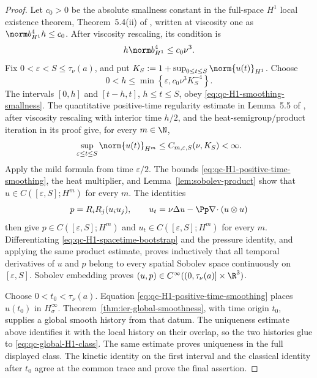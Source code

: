 \begin{proof}
Let \(c_0>0\) be the absolute smallness constant in the full-space
\(H^1\) local existence theorem, Theorem~5.4(ii) of \cite{Tao2013},
written at viscosity one as
\(\norm b_{H^1}^4h\le c_0\).  After viscosity rescaling, its condition is
\begin{equation}
 h\norm b_{H^1}^4\le c_0\nu^3.
 \label{eq:qc-H1-smoothing-smallness}
\end{equation}
Fix \(0<\varepsilon<S\le\tau_\nu(a)\), and put
\(K_S:=1+\sup_{0\le t\le S}\norm{u(t)}_{H^1}\).  Choose
\[
 0<h\le\min\left\{\varepsilon,
 c_0\nu^3K_S^{-4}\right\}.
\]
The intervals \([0,h]\) and \([t-h,t]\), \(h\le t\le S\), obey
\eqref{eq:qc-H1-smoothing-smallness}.  The quantitative positive-time
regularity estimate in Lemma~5.5 of \cite{Tao2013}, after viscosity
rescaling with interior time \(h/2\), and the
heat-semigroup/product iteration in its proof give, for every \(m\in\N\),
\begin{equation}
 \sup_{\varepsilon\le t\le S}\norm{u(t)}_{H^m}
 \le C_{m,\varepsilon,S}(\nu,K_S)<\infty.
 \label{eq:qc-H1-positive-time-smoothing}
\end{equation}
Apply the mild formula from time \(\varepsilon/2\).  The bounds
\eqref{eq:qc-H1-positive-time-smoothing}, the heat multiplier, and
Lemma~\ref{lem:sobolev-product} show that
\(u\in C([\varepsilon,S];H^m)\) for every \(m\).  The identities
\begin{equation}
 p=R_iR_j(u_i u_j),
 \qquad
 u_t=\nu\Delta u-\Pp\nabla\!\cdot(u\otimes u)
 \label{eq:qc-H1-spacetime-bootstrap}
\end{equation}
then give
\(p\in C([\varepsilon,S];H^m)\) and
\(u_t\in C([\varepsilon,S];H^m)\) for every \(m\).  Differentiating
\eqref{eq:qc-H1-spacetime-bootstrap} and the pressure identity, and applying
the same product estimate, proves inductively that all temporal derivatives
of \(u\) and \(p\) belong to every spatial Sobolev space continuously on
\([\varepsilon,S]\).  Sobolev embedding proves
\((u,p)\in C^\infty((0,\tau_\nu(a)]\times\R^3)\).

Choose \(0<t_0<\tau_\nu(a)\).  Equation
\eqref{eq:qc-H1-positive-time-smoothing} places \(u(t_0)\) in
\(H^\infty_\sigma\).  Theorem~\ref{thm:ier-global-smoothness}, with time
origin \(t_0\), supplies a global smooth history from that datum.  The
uniqueness estimate above identifies it with the local history on their
overlap, so the two histories glue to \eqref{eq:qc-global-H1-class}.
The same estimate proves uniqueness in the full displayed class.  The kinetic
identity on the first interval and the classical identity after \(t_0\) agree
at the common trace and prove the final assertion.
\end{proof}

